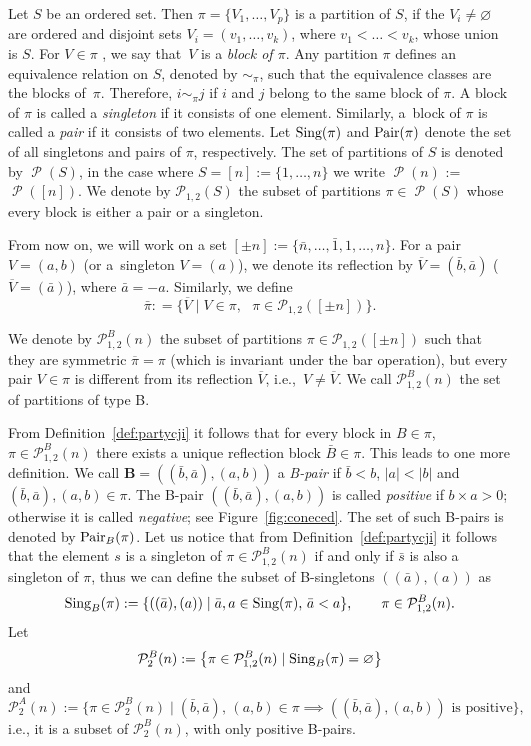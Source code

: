 \documentclass[pdftex]{sigma}
\numberwithin{equation}{section}
\def\P{\mathcal{P}}
\def\BL{{\mathbf{B}}}
\def\PA{\mathcal{P}^{A}}
\def\Pair{\text{\normalfont Pair}}
\def\Sing{\text{\normalfont Sing}}
\DeclareMathOperator{\Part}{\mathcal{P}}
\begin{document}
Let $S$ be an ordered set. Then $\pi = \{ V_1,\dots, V_p\}$ is a partition of $S$, if the $V_i \neq \varnothing$ are
ordered and disjoint sets $V_i=(v_1,\dots,v_k)$, where $v_1<\dots<v_k$, whose union is $S$.
For $V \in \pi$ , we say that~$V$ is a \emph{block of $\pi$}.
Any partition $\pi$ defines an equivalence relation on $S$,
denoted by $\sim_\pi$, such that the equivalence classes are the
blocks of~$\pi$.
Therefore, $i\sim_\pi j$ if $i$ and $j$ belong to the same block of $\pi$.
A block of $\pi$ is called a \emph{singleton} if it consists of one element.
Similarly, a~block of $\pi$ is called a \emph{pair} if it consists of two elements.
Let $\Sing(\pi)$ and $\Pair(\pi)$ denote the set of all singletons and pairs of $\pi$, respectively.
The set of partitions of $S$ is denoted by $\Part(S)$, in the case where $S =
[n] := \{1, \dots , n\}$ we write $\Part(n)$ := $\Part([n])$.
We denote by $\P_{1,2}(S)$ the subset of partitions $\pi \in \Part(S)$ whose every block is either a
pair or a singleton.

From now on, we will work on a set $[\pm n]:=\{\bar n, \dots , \bar 1, 1,\dots, n\}$.
For a pair $V=(a,b)$ (or a~singleton $V=(a)$), we denote its reflection by $\overline V=(\bar b , \bar a)$ ($\overline V=( \bar a)$), where $\bar a =-a$.
Similarly, we define
\[
\bar \pi: =\big\{\overline{V}\mid V\in \pi,\text{ } \pi \in \P_{1,2}([\pm n])\big\}.
\]

\begin{Definition} \label{def:partycji}
	We denote by $\P_{1,2}^{B}(n)$ the subset of partitions $\pi \in \P_{1,2}([\pm n])$
	such that they are symmetric $\overline{\pi} =
	\pi$ (which is invariant under the bar operation), but every pair $V \in \pi$ is different from its reflection
	$\overline{V}$, i.e.,~$V \neq \overline{V}$.
	We call $\P_{1,2}^{B}(n)$ the set of partitions of type B.
\end{Definition}

From Definition~\ref{def:partycji} it follows that for every block in $B\in \pi$, $\pi \in \P_{1,2}^{B}(n)$ there exists a unique {reflection block} $\bar B\in\pi$.
This leads to one more definition.
We call $\BL= ((\bar b, \bar a),( a,b))$ a \emph{B-pair} if $\bar b <b$, $|{a}| <|b|$ and $(\bar b,\bar a ), (a,b)\in \pi$.
The B-pair $((\bar b, \bar a),( a,b))$ is called \emph{positive} if $b\times a >0 $; otherwise
it is called \emph{negative}; see Figure~\ref{fig:coneced}.
The set of such B-pairs is denoted by $\Pair_B(\pi)$.
Let us notice that from Definition~\ref{def:partycji} it follows that
the element $s$ is a singleton of $\pi \in \P_{1,2}^{B}(n)$ if and only if $\bar s$ is also a singleton of $\pi$, thus we can define the subset of B-singletons $((\bar a),(a))$ as
\[
\Sing_B(\pi):=\{((\bar a), (a)) \mid \bar a,a \in \Sing(\pi), \,\bar a < a\}, \qquad \pi \in \P_{1,2}^{B}(n).
\]
Let
\[
\P_{2}^{B}(n):=\big\{\pi \in \P_{1,2}^{B}(n)\mid \Sing_B(\pi)=\varnothing\big\}
\]
and
\[
\PA_2(n):=\big\{\pi \in \P_{2}^{B}(n)\mid (\bar b,\bar a ),\, (a,b)\in \pi \implies ((\bar b,\bar a ), (a,b))\text{ is positive}\big\},
\]
i.e., it is a subset of $\P_{2}^{B}(n)$, with only positive B-pairs.
\end{document}
